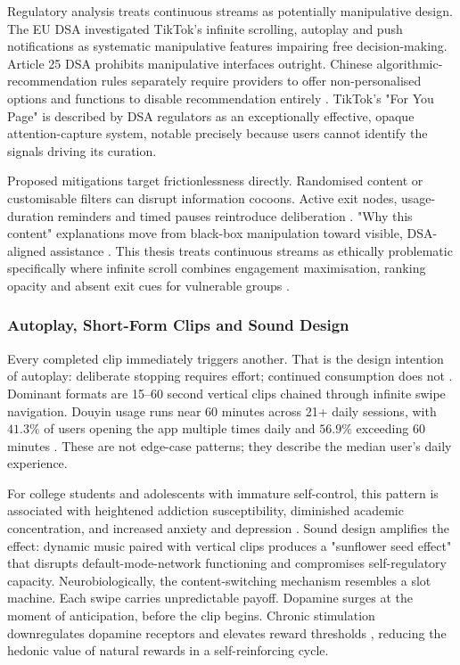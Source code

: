 \documentclass[11pt]{article}
\begin{document}
Regulatory analysis treats continuous streams as potentially manipulative design. The EU DSA investigated TikTok's infinite scrolling, autoplay and push notifications as systematic manipulative features impairing free decision-making. Article 25 DSA prohibits manipulative interfaces outright. Chinese algorithmic-recommendation rules separately require providers to offer non-personalised options and functions to disable recommendation entirely \parencites[2]{8958037}[7]{8958037}. TikTok's "For You Page" is described by DSA regulators \parencites[16]{6502223} as an exceptionally effective, opaque attention-capture system, notable precisely because users cannot identify the signals driving its curation.

Proposed mitigations target frictionlessness directly. Randomised content or customisable filters can disrupt information cocoons. Active exit nodes, usage-duration reminders and timed pauses reintroduce deliberation \parencites[7]{8958037}. "Why this content" explanations move from black-box manipulation toward visible, DSA-aligned assistance \parencites[7]{8958037}[8]{5142478}. This thesis treats continuous streams as ethically problematic specifically where infinite scroll combines engagement maximisation, ranking opacity and absent exit cues for vulnerable groups \parencites[2]{8958037}[3]{8958037}[2]{3303310}[16]{6502223}.

\subsubsection{Autoplay, Short-Form Clips and Sound Design}
\label{sec:autoplay_shortform_sound} Every completed clip immediately triggers another. That is the design intention of autoplay: deliberate stopping requires effort; continued consumption does not \parencites[2]{8958037}[3]{8958037}. Dominant formats are 15--60 second vertical clips chained through infinite swipe navigation. Douyin usage runs near 60 minutes across 21+ daily sessions, with $41.3\%$ of users opening the app multiple times daily and $56.9\%$ exceeding 60 minutes \parencites[3]{8958037}. These are not edge-case patterns; they describe the median user's daily experience.

For college students and adolescents with immature self-control, this pattern is associated with heightened addiction susceptibility, diminished academic concentration, and increased anxiety and depression \parencites[2]{8958037}[6]{8958037}. Sound design amplifies the effect: dynamic music paired with vertical clips produces a "sunflower seed effect" \parencites[3]{8958037} that disrupts default-mode-network functioning and compromises self-regulatory capacity. Neurobiologically, the content-switching mechanism resembles a slot machine. Each swipe carries unpredictable payoff. Dopamine surges at the moment of anticipation, before the clip begins. Chronic stimulation downregulates dopamine receptors and elevates reward thresholds \parencites[4]{8958037}, reducing the hedonic value of natural rewards in a self-reinforcing cycle.
\end{document}
